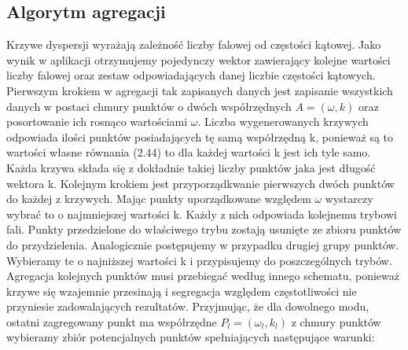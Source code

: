 \subsection{Algorytm agregacji}
 Krzywe dyspersji wyrażają zależność liczby falowej od częstości kątowej. Jako wynik w aplikacji otrzymujemy pojedynczy wektor zawierający kolejne wartości liczby falowej oraz zestaw odpowiadających danej liczbie częstości kątowych. Pierwszym krokiem w agregacji tak zapisanych danych jest zapisanie wszystkich danych w postaci chmury punktów o dwóch współrzędnych $A=(\omega , k)$ oraz posortowanie ich rosnąco wartościami $\omega$. Liczba wygenerowanych krzywych odpowiada ilości punktów posiadających tę samą współrzędną k, ponieważ są to wartości własne równania (2.44) to dla każdej wartości k jest ich tyle samo. Każda krzywa składa się z dokładnie takiej liczby punktów jaka jest długość wektora k. Kolejnym krokiem jest przyporządkwanie pierwszych dwóch punktów do każdej z krzywych. Mając punkty uporządkowane względem $\omega$ wystarczy wybrać to o najmniejszej wartości k. Każdy z nich odpowiada kolejnemu trybowi fali. Punkty przedzielone do właściwego trybu zostają usunięte ze zbioru punktów do przydzielenia. Analogicznie postępujemy w przypadku drugiej grupy punktów. Wybieramy te o najniższej wartości k i przypisujemy do poszczególnych trybów. Agregacja kolejnych punktów musi przebiegać według innego schematu, ponieważ krzywe się wzajemnie przesinają i segregacja względem częstotliwości nie przyniesie zadowalających rezultatów. Przyjmując, że dla dowolnego modu, ostatni zagregowany punkt ma współrzędne $P_l = (\omega _l,k_l)$ z chmury punktów wybieramy zbiór potencjalnych punktów spełniających następujące warunki:
